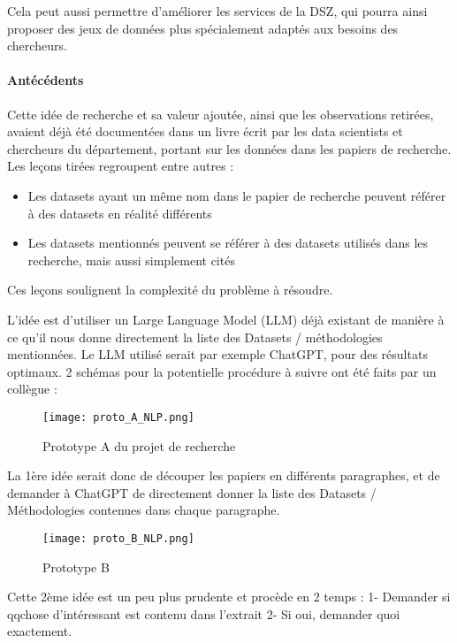 Cela peut aussi permettre d'améliorer les services de la DSZ, qui pourra ainsi proposer des jeux de données plus spécialement adaptés aux besoins des chercheurs.


\paragraph{Antécédents}

Cette idée de recherche et sa valeur ajoutée, ainsi que les observations retirées, avaient déjà été documentées dans un livre écrit par les data scientists et chercheurs du département, portant sur les données dans les papiers de recherche.
Les leçons tirées regroupent entre autres : 

\begin{itemize}
    \item Les datasets ayant un même nom dans le papier de recherche peuvent référer à des datasets en réalité différents
    \item Les datasets mentionnés peuvent se référer à des datasets utilisés dans les recherche, mais aussi simplement cités
\end{itemize}

Ces leçons soulignent la complexité du problème à résoudre.

L'idée est d'utiliser un Large Language Model (LLM) déjà existant de manière à ce qu'il nous donne directement la liste des Datasets / méthodologies mentionnées.
Le LLM utilisé serait par exemple ChatGPT, pour des résultats optimaux.
2 schémas pour la potentielle procédure à suivre ont été faits par un collègue :

\begin{figure}[H]
    \centering
    \texttt{[image: proto\_A\_NLP.png]}
    \caption{Prototype A du projet de recherche}
\end{figure}

La 1ère idée serait donc de découper les papiers en différents paragraphes, et de demander à ChatGPT de directement donner la liste des Datasets / Méthodologies contenues dans chaque paragraphe.

\begin{figure}[H]
    \centering
    \texttt{[image: proto\_B\_NLP.png]}
    \caption{Prototype B}
\end{figure}

Cette 2ème idée est un peu plus prudente et procède en 2 temps : 1- Demander si qqchose d'intéressant est contenu dans l'extrait
2- Si oui, demander quoi exactement.


